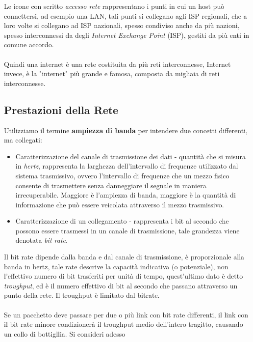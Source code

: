 \documentclass[12pt, letterpaper]{article}
\newcommand{\acc}{\\\hphantom{}\\}
\begin{document}
Le icone con scritto \textit{accesso rete} rappresentano i punti in cui un host può connettersi, ad esempio una LAN, tali punti si
collegano agli ISP regionali, che a loro volte si collegano ad ISP nazionali, spesso condiviso anche da più nazioni, spesso
interconnessi da degli \textit{Internet Exchange Point} (ISP), gestiti da più enti in comune accordo.\acc Quindi una
internet è una rete costituita da più reti interconnesse, Internet invece, è la "internet" più grande e famosa, composta da migliaia di reti
interconnesse.
\subsection{Prestazioni della Rete}
Utilizziamo il termine \textbf{ampiezza di banda} per intendere due concetti differenti, ma collegati: \begin{itemize}
    \item Caratterizzazione del canale di trasmissione dei dati - quantità che si misura in \textit{hertz},
          rappresenta la larghezza dell'intervallo di frequenze utilizzato dal sistema trasmissivo,
          ovvero l'intervallo di frequenze che un mezzo fisico consente di trasmettere senza
          danneggiare il segnale in maniera irrecuperabile. Maggiore è l'ampiezza di banda,
          maggiore è la quantità di informazione che può essere veicolata attraverso il mezzo
          trasmissivo.
    \item Caratterizzazione di un collegamento - rappresenta i bit al secondo che possono essere trasmessi
          in un canale di trasmissione, tale grandezza viene denotata \textit{bit rate}.
\end{itemize}
Il bit rate dipende dalla banda e dal canale di trasmissione, è proporzionale alla banda in hertz, tale rate descrive
la capacità indicativa (o potenziale), non l'effettivo numero di bit trasferiti per unità di tempo, quest'ultimo
dato è detto \textit{troughput}, ed è il numero effettivo di bit al secondo che passano attraverso un
punto della rete. Il troughput è limitato dal bitrate.\acc
Se un pacchetto deve passare per due o più link con bit rate differenti, il link con il bit rate minore
condizionerà il troughput medio dell'intero tragitto, causando un collo di bottigllia. Si consideri adesso
\end{document}
